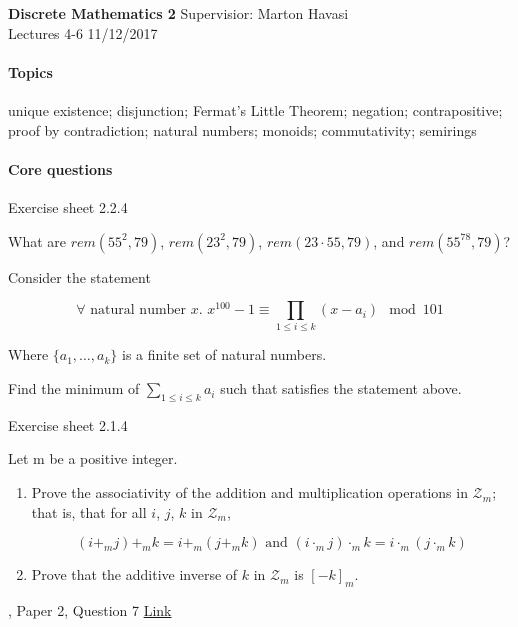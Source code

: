 \documentclass{exam}
\begin{document}
\noindent
\large\textbf{Discrete Mathematics 2} \hfill Supervisior: Marton Havasi \\
\normalsize Lectures 4-6 \hfill 11/12/2017
\paragraph{Topics}

unique existence; disjunction; Fermat's Little Theorem; negation; contrapositive; proof by contradiction; natural numbers; monoids; commutativity; semirings

\paragraph{Core questions}
\begin{questions}
\question Exercise sheet 2.2.4

What are $rem(55^2, 79)$, $rem(23^2, 79)$, $rem(23 \cdot 55, 79)$, and $rem(55^{78}, 79)$?

\question Consider the statement

$$\forall \text{ natural number }x \text{. } x^{100} - 1 \equiv \prod_{1 \le i \le k} (x-a_i) \mod 101$$

Where $\{a_1, \ldots , a_k \}$ is a finite set of natural numbers.

Find the minimum of $\sum_{1 \le i \le k} a_i$ such that satisfies the statement above.

\question Exercise sheet 2.1.4

 Let m be a positive integer.
 
 \begin{enumerate}
\item Prove the associativity of the addition and multiplication operations in $\mathcal{Z}_m$; that is, that for all $i$, $j$, $k$
in $\mathcal{Z}_m$,

$$(i +_m j) +_m k = i +_m (j +_m k) \text{ and } (i \cdot_m j) \cdot_m k = i \cdot_m (j \cdot_m k)$$

\item Prove that the additive inverse of $k$ in $\mathcal{Z}_m$ is $[-k]_m$.
 
 \end{enumerate}


, Paper 2, Question 7
\href{http://www.cl.cam.ac.uk/teaching/exams/pastpapers/y2014p2q7.pdf}{Link}

\end{questions}
\end{document}
